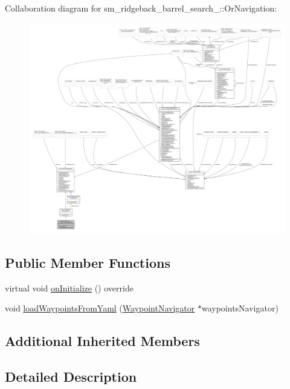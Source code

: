Collaboration diagram for sm\+\_\+ridgeback\+\_\+barrel\+\_\+search\+\_\+:\+:Or\+Navigation\+:
\nopagebreak
\begin{figure}[H]
\begin{center}
\leavevmode
\includegraphics[width=350pt]{classsm__ridgeback__barrel__search__1_1_1OrNavigation__coll__graph}
\end{center}
\end{figure}
\subsection*{Public Member Functions}
\begin{DoxyCompactItemize}
\item 
virtual void \hyperlink{classsm__ridgeback__barrel__search__1_1_1OrNavigation_ac144dc365f1d7708dfeace36b8734885}{on\+Initialize} () override
\item 
void \hyperlink{classsm__ridgeback__barrel__search__1_1_1OrNavigation_a875df5d1fdcd34f568e6db573dfbaed7}{load\+Waypoints\+From\+Yaml} (\hyperlink{classcl__move__base__z_1_1WaypointNavigator}{Waypoint\+Navigator} $\ast$waypoints\+Navigator)
\end{DoxyCompactItemize}
\subsection*{Additional Inherited Members}


\subsection{Detailed Description}


